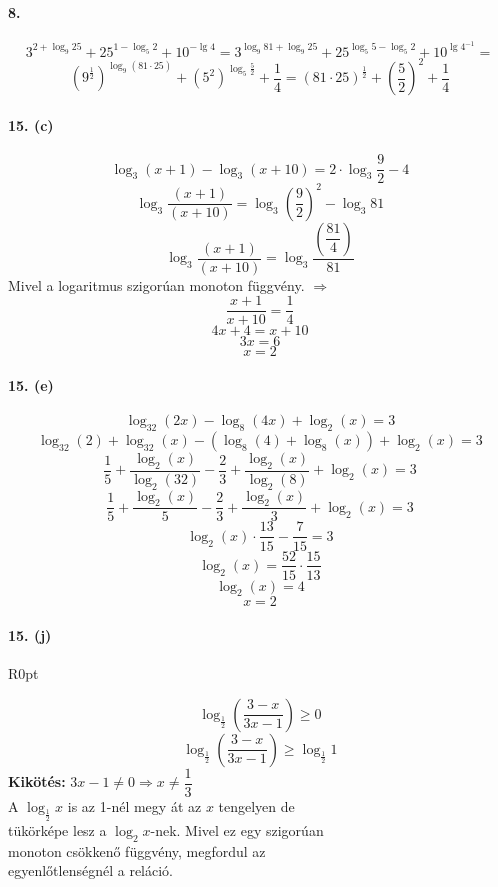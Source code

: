 \documentclass[12pt,a4paper,fleqn]{article}
\newcommand{\myparagraph}[1]{\paragraph{#1}\mbox{}}
\begin{document}
\myparagraph{8.}
\[ 3^{2+\log_9 25} + 25^{1-\log_5 2} + 10^{-\lg 4} = 3^{\log_9 81 + \log_9 25} +
  25^{\log_5 5 - \log_5 2} + 10^{\lg 4^{-1}} = \]
\[ \left(9^{\frac{1}{2}}\right)^{\log_9 (81 \cdot 25)} + \left(5^2\right)^{\log_5 \frac{5}{2}} +
  \dfrac{1}{4} = (81 \cdot 25)^{\frac{1}{2}} + \left(\dfrac{5}{2}\right)^2 + \dfrac{1}{4} \]

\myparagraph{15. (c)}
\[ \log_3 (x+1) - \log_3 (x+10) = 2 \cdot \log_3 \frac{9}{2} - 4 \]
\[ \log_3 \dfrac{(x+1)}{(x+10)} = \log_3 \left(\dfrac{9}{2}\right)^2 - \log_3 81 \]
\[ \log_3 \dfrac{(x+1)}{(x+10)} = \log_3 \dfrac{\left(\dfrac{81}{4}\right)}{81} \]
Mivel a logaritmus szigorúan monoton függvény. $\Longrightarrow$
\[ \dfrac{x+1}{x+10} = \dfrac{1}{4} \]
\[ 4x + 4 = x + 10 \]
\[ 3x = 6 \]
\[ x = 2 \]

\myparagraph{15. (e)}
\[ \log_{32} (2x) - \log_8 (4x) + \log_2 (x) = 3 \]
\[ \log_{32} (2) + \log_{32} (x) - (\log_8 (4) + \log_8 (x)) + \log_2 (x) = 3 \]
\[ \dfrac{1}{5} + \dfrac{\log_2 (x)}{\log_2 (32)} - \dfrac{2}{3} + \dfrac{\log_2 (x)}{\log_2 (8)} +
  \log_2 (x) = 3\]
\[ \dfrac{1}{5} + \dfrac{\log_2 (x)}{5} - \dfrac{2}{3} + \dfrac{\log_2 (x)}{3} + \log_2 (x) = 3 \]
\[ \log_2 (x) \cdot \dfrac{13}{15} - \dfrac{7}{15} = 3 \]
\[ \log_2 (x) = \dfrac{52}{15} \cdot \dfrac{15}{13} \]
\[ \log_2 (x) = 4 \]
\[ x = 2 \]

\clearpage
\myparagraph{15. (j)}

\begin{wrapfigure}[0]{R}{0pt}
\end{wrapfigure}
\[ \log_{\frac{1}{2}} \left( \dfrac{3-x}{3x-1} \right) \geq 0 \]
\[ \log_{\frac{1}{2}} \left( \dfrac{3-x}{3x-1} \right) \geq \log_{\frac{1}{2}} 1 \]
\textbf{Kikötés:} $ 3x -1 \neq 0 \Rightarrow x \neq \dfrac{1}{3} $ \\[2em]
A $\log_{\frac{1}{2}} x$ is az 1-nél megy át az $x$ tengelyen de \\
tükörképe lesz a $\log_2 x$-nek. Mivel ez egy szigorúan \\
monoton csökkenő függvény, megfordul az \\
egyenlőtlenségnél a reláció.
\end{document}
